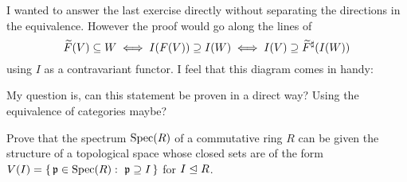 \documentclass[12pt]{memoir}
\begin{document}
I wanted to answer the last exercise directly without separating the directions in the equivalence. However the proof would go along the lines of 
$$\widetilde F(V)\subseteq W \iff I(F(V))\supseteq I(W)\iff I(V)\supseteq \widetilde{F}^\sharp(I(W))$$
using $I$ as a contravariant functor. I feel that this diagram comes in handy:
\begin{figure}[h]
\centering
\end{figure}
My question is, can this statement be proven in a direct way? Using the equivalence of categories maybe?
\begin{Ej}[2.6.1]
  Prove that the spectrum $\operatorname{Spec}(R)$ of a commutative ring $R$ can be given the structure of a topological space whose closed sets are of the form $V(I)=\set{\lie p\in\Spec(R):\ \lie p\supseteq I}$ for $I\trianglelefteq R$.
\end{Ej}
\end{document}
